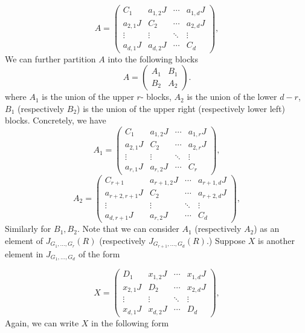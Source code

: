 \documentclass[12pt, a4paper]{amsart}
\numberwithin{equation}{section} %
\theoremstyle{plain}
\theoremstyle{definition}
\theoremstyle{plain}
\theoremstyle{remark}
\newcommand{\ones}{J}
\begin{document}
\begin{equation*}
A=\left(\begin{array}{c|c|c|c}
C_1 & a_{1,2}\ones & \cdots & a_{1,d}\ones \\
\hline
a_{2,1}\ones & C_2 & \cdots & a_{2,d}\ones \\
\hline
\vdots & \vdots & \ddots & \vdots \\
\hline
a_{d,1}\ones & a_{d,2}\ones & \cdots & C_d
\end{array}\right),
\end{equation*}
We can further partition $A$ into the following blocks 
\[ A =\begin{pmatrix} A_1 & B_1 \\ B_2 & A_2 \end{pmatrix} .\] 
where $A_1$ is the union of the upper $r$- blocks, $A_2$ is the union of the lower $d-r$, $B_1$ (respectively $B_2$) is the union of the upper right (respectively lower left) blocks. Concretely, we have 
\begin{equation*}
A_1=\left(\begin{array}{c|c|c|c}
C_1 & a_{1,2}\ones & \cdots & a_{1,r}\ones \\
\hline
a_{2,1}\ones & C_2 & \cdots & a_{2,r}\ones \\
\hline
\vdots & \vdots & \ddots & \vdots \\
\hline
a_{r,1}\ones & a_{r,2}\ones & \cdots & C_r
\end{array}\right),
\end{equation*}
\begin{equation*}
A_2=\left(\begin{array}{c|c|c|c}
C_{r+1} & a_{r+1,2}\ones & \cdots & a_{r+1,d}\ones \\
\hline
a_{r+2,r+1}\ones & C_2 & \cdots & a_{r+2,d}\ones \\
\hline
\vdots & \vdots & \ddots & \vdots \\
\hline
a_{d,r+1}\ones & a_{r,2}\ones & \cdots & C_d
\end{array}\right),
\end{equation*}
Similarly for $B_1, B_2$. Note that we can consider $A_1$ (respectively $A_2$) as an element of $J_{G_1, \ldots, G_r}(R)$ (respectively $J_{G_{r+1}, \ldots, G_d}(R)$.) Suppose $X$ is another element in $J_{G_1, \ldots, G_d}$ of the form 

\begin{equation*}
X=\left(\begin{array}{c|c|c|c}
D_1 & x_{1,2}\ones & \cdots & x_{1,d}\ones \\
\hline
x_{2,1}\ones & D_2 & \cdots & x_{2,d}\ones \\
\hline
\vdots & \vdots & \ddots & \vdots \\
\hline
x_{d,1}\ones & x_{d,2}\ones & \cdots & D_d
\end{array}\right),
\end{equation*}
Again, we can write $X$ in the following form
\end{document}

